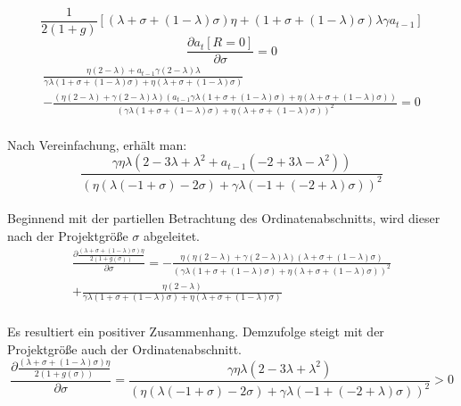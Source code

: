 \begin{equation}
\frac{1}{2(1+g)}[(\lambda+\sigma+(1-\lambda)\sigma)\eta+(1+\sigma+(1-\lambda)\sigma)\lambda\gamma a_{t-1}]
\end{equation}
\begin{equation}\boxed{
\frac{\partial a_t[R=0]}{\partial\sigma}=0}
\end{equation}
\begin{equation}
\begin{split}
\frac{\eta (2 - \lambda) +a_{t-1} \gamma(2 - \lambda) \lambda}{\gamma \lambda (1 + \sigma +(1- \lambda) \sigma)+ \eta (\lambda + \sigma + (1- \lambda) \sigma)}\\
- \frac{ (\eta (2- \lambda)+ \gamma (2 - \lambda) \lambda)(a_{t-1} \gamma \lambda (1+ \sigma +(1- \lambda)\sigma) + \eta (\lambda + \sigma + (1 -\lambda) \sigma))}{(\gamma \lambda (1+ \sigma + (1 - \lambda) \sigma)+ \eta (\lambda + \sigma + (1 - \lambda) \sigma))^{2}}=0
\end{split}
\end{equation}
\\
Nach Vereinfachung, erhält man:
\begin{equation}
\frac{\gamma \eta \lambda (2 -3 \lambda +\lambda^{2} + a_{t-1} (-2 +3 \lambda -\lambda^{2}))}{(\eta ( \lambda(-1 + \sigma) -2 \sigma) + \gamma \lambda(-1 +(-2 + \lambda) \sigma))^{2}}
\end{equation}
\\
Beginnend mit der partiellen Betrachtung des Ordinatenabschnitts, wird dieser nach der Projektgrö{\ss}e $\sigma$ abgeleitet.  
\begin{equation}
\begin{split}
\frac{\partial\frac{(\lambda + \sigma + (1- \lambda) \sigma) \eta}{2(1+ g(\sigma))}}{\partial\sigma}=- \frac{\eta( \eta (2- \lambda) + \gamma (2- \lambda) \lambda)(\lambda + \sigma + (1- \lambda) \sigma)}{(\gamma \lambda (1+ \sigma +(1- \lambda) \sigma) + \eta( \lambda + \sigma + (1- \lambda) \sigma))^{2}}\\
+ \frac{\eta (2- \lambda)}{\gamma \lambda (1+ \sigma +(1- \lambda) \sigma) + \eta( \lambda + \sigma + (1- \lambda) \sigma)}
\end{split}
\end{equation}
\\
Es resultiert ein positiver Zusammenhang. Demzufolge steigt mit der Projektgrö{\ss}e auch der Ordinatenabschnitt.
\begin{equation}
\frac{\partial\frac{(\lambda + \sigma + (1- \lambda) \sigma) \eta}{2(1+ g(\sigma))}}{\partial\sigma}=\frac{\gamma \eta \lambda(2 -3\lambda +\lambda^{2})}{(\eta(\lambda(-1 + \sigma)-2 \sigma) + \gamma \lambda (-1 + (-2 + \lambda) \sigma))^{2}}>0
\end{equation}
